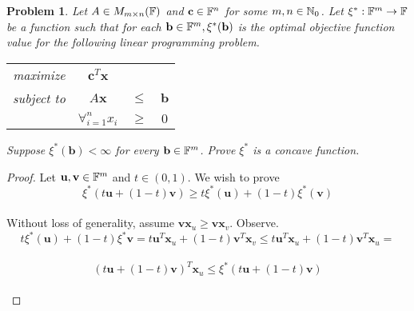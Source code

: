 \documentclass[12pt,oneside]{amsart}
\numberwithin{equation}{section}
\numberwithin{figure}{section}
\theoremstyle{plain}
\newtheorem{prob}{Problem}
\theoremstyle{definition}
\newcommand{\N}{\ensuremath \mathbb{N}}
\newcommand{\F}{\ensuremath \mathbb{F}}
\begin{document}
\begin{prob}
  Let $A \in M_{m \times n}(\F)$ and $\mathbf{c} \in \F^n$ for some $m,n \in \N_0$. 
  Let $\xi^*: \F^m \to \F$ be a function such that for each $\mathbf{b} \in \F^m, 
  \xi^*(\mathbf{b})$ is the optimal objective function value for the following 
  linear programming problem. \\
  \begin{center}\begin{tabular}{cccc}
    maximize   & $\mathbf{c}^T\mathbf{x}$ &        &              \\
    subject to & $A\mathbf{x}$            & $\leq$ & $\mathbf{b}$ \\
               & $\forall_{i=1}^{n}x_i$   & $\geq$ & $0$          \\
  \end{tabular}\end{center}
  Suppose $\xi^*(\mathbf{b}) < \infty$ for every $\mathbf{b} \in \F^m$. Prove 
  $\xi^*$ is a concave function. \\
\end{prob}
\begin{proof}
  Let $\mathbf{u},\mathbf{v} \in \F^m$ and $t \in (0,1)$. We wish to prove \\
  \[\xi^*(t\mathbf{u} + (1-t)\mathbf{v}) \geq t\xi^*(\mathbf{u}) + (1-t)\xi^*(\mathbf{v})\] \\
  Without loss of generality, assume $\mathbf{v}\mathbf{x}_u \geq \mathbf{v}\mathbf{x}_v$. 
  Observe. \\
  \[t\xi^*(\mathbf{u}) + (1-t)\xi^*{\mathbf{v}} = t\mathbf{u}^T\mathbf{x}_u + 
  (1-t)\mathbf{v}^T\mathbf{x}_v \leq t\mathbf{u}^T\mathbf{x}_u + (1-t)\mathbf{v}^T
  \mathbf{x}_u = \] \\
  \[(t\mathbf{u} + (1-t)\mathbf{v})^T\mathbf{x}_u \leq \xi^*(t\mathbf{u} 
  + (1-t)\mathbf{v})\] \\
\end{proof}
\end{document}
